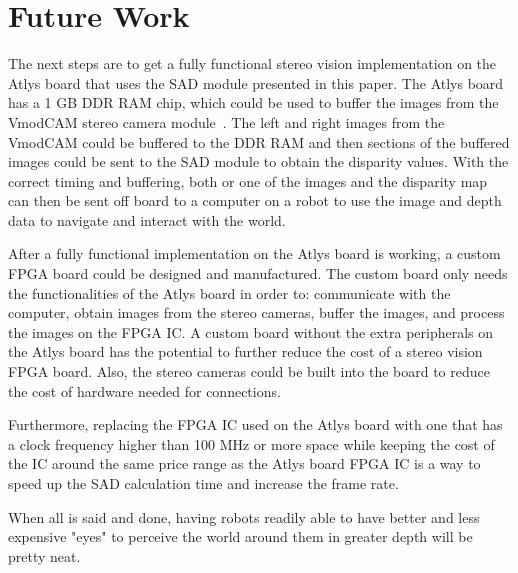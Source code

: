 \chapter{Future Work}

The next steps are to get a fully functional stereo vision implementation on the Atlys board that uses the SAD module presented in this paper. The Atlys board has a 1 GB DDR RAM chip, which could be used to buffer the images from the VmodCAM stereo camera module~\cite{atlysBoard}. The left and right images from the VmodCAM could be buffered to the DDR RAM and then sections of the buffered images could be sent to the SAD module to obtain the disparity values. With the correct timing and buffering, both or one of the images and the disparity map can then be sent off board to a computer on a robot to use the image and depth data to navigate and interact with the world.

After a fully functional implementation on the Atlys board is working, a custom FPGA board could be designed and manufactured. The custom board only needs the functionalities of the Atlys board in order to: communicate with the computer, obtain images from the stereo cameras, buffer the images, and process the images on the FPGA IC. A custom board without the extra peripherals on the Atlys board has the potential to further reduce the cost of a stereo vision FPGA board. Also, the stereo cameras could be built into the board to reduce the cost of hardware needed for connections.

Furthermore, replacing the FPGA IC used on the Atlys board with one that has a clock frequency higher than 100 MHz or more space while keeping the cost of the IC around the same price range as the Atlys board FPGA IC is a way to speed up the SAD calculation time and increase the frame rate.

When all is said and done, having robots readily able to have better and less expensive "eyes" to perceive the world around them in greater depth will be pretty neat.